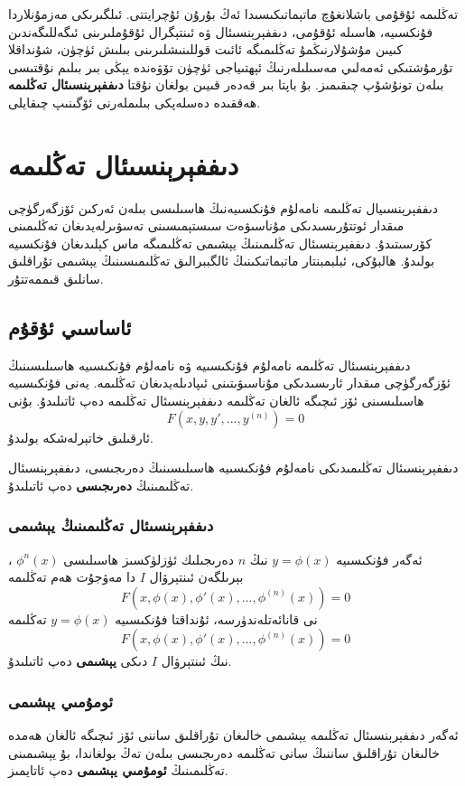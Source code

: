 \par\bigskip
\begin{tcolorbox}
تەڭلىمە ئۇقۇمى باشلانغۇچ ماتېماتىكىسىدا ئەڭ بۇرۇن ئۇچرايتتى. ئىلگىرىكى مەزمۇنلاردا فۇنكسىيە، ھاسىلە ئۇقۇمى، دىففېرېنسىئال ۋە ئىنتېگرال ئۇقۇملىرىنى ئىگەللىگەندىن كىيىن مۇشۇلارنىڭمۇ تەڭلىمىگە ئائىت قوللىنىشلىرىنى بىلىش ئۈچۈن، شۇنداقلا تۇرمۇشتىكى ئەمەلىي مەسىلىلەرنىڭ ئېھتىياجى ئۈچۈن تۆۋەندە يېڭى بىر بىلىم نۇقتىسى بىلەن تونۇشۇپ چىقىمىز. بۇ باپتا بىر قەدەر قىيىن بولغان نۇقتا
\textbf{دىففېرېنسىئال تەڭلىمە}
ھەققىدە دەسلەپكى بىلىملەرنى ئۆگىنىپ چىقايلى.

\end{tcolorbox}
\section{دىففېرېنسىئال تەڭلىمە}
دىففېرېنسىيال تەڭلىمە نامەلۇم فۇنكسىيەنىڭ ھاسىلىسى بىلەن ئەركىن ئۆزگەرگۈچى مىقدار ئوتتۇرىسىدىكى مۇناسىۋەت سىستېمىسىنى تەسۋىرلەيدىغان تەڭلىمىنى كۆرسىتىدۇ. دىففېرېنسىئال تەڭلىمىنىڭ يېشىمى تەڭلىمىگە ماس كېلىدىغان فۇنكسىيە بولىدۇ. ھالبۇكى، ئبلبمبنتار ماتبماتىكىنىڭ ئالگببرالىق تەڭلىمىسىنىڭ يېشىمى تۇراقلىق سانلىق قىممەتتۇر. 
\subsection{ئاساسىي ئۇقۇم}

\begin{MyDefinition}{دىففېرېنسىئال تەڭلىمە}{}
	نامەلۇم فۇنكىسىيە ۋە نامەلۇم فۇنكىسىيە ھاسىلىسىنىڭ ئۆزگەرگۈچى مىقدار ئارىسىدىكى مۇناسىۋىتىنى ئىپادىلەيدىغان تەڭلىمە. يەنى فۇنكىسىيە ھاسىلىسىنى ئۆز ئىچىگە ئالغان تەڭلىمە دىففېرېنسىئال تەڭلىمە دەپ ئاتىلىدۇ. بۇنى $$F(x,y,y',...,y^{(n)})=0$$ ئارقىلىق خاتېرلەشكە بولىدۇ.
\end{MyDefinition}
دىففېرېنسىئال تەڭلىمىدىكى نامەلۇم فۇنكىسىيە ھاسىلىسىنىڭ دەرىجىسى، دىففېرېنسىئال تەڭلىمىنىڭ \textbf{دەرىجىسى} دەپ ئاتىلىدۇ.

\subsubsection{دىففېرېنسىئال تەڭلىمىنىڭ يېشىمى}
ئەگەر فۇنكىسىيە $y=\phi(x)$ نىڭ $n$ دەرىجىلىك ئۈزلۈكسىز ھاسىلىسى $\phi^n(x)$ ، بېرىلگەن ئىنتېرۋال $I$ دا مەۋجۇت ھەم تەڭلىمە
$$F(x,\phi(x),\phi'(x),...,\phi^{(n)}(x))=0$$
نى قانائەتلەندۈرسە، ئۇنداقتا فۇنكىسىيە $y=\phi(x)$ تەڭلىمە
$$F(x,\phi(x),\phi'(x),...,\phi^{(n)}(x))=0$$
نىڭ ئىنتېرۋال $I$ دىكى \textbf{يېشىمى} دەپ ئاتىلىدۇ. 
\subsubsection{ئومۇمىي يېشىمى}
ئەگەر دىففېرېنسىئال تەڭلىمە يېشىمى خالىغان تۇراقلىق ساننى ئۆز ئىچىگە ئالغان ھەمدە خالىغان تۇراقلىق ساننىڭ سانى تەڭلىمە دەرىجىسى بىلەن تەڭ بولغاندا، بۇ يېشىمىنى تەڭلىمىنىڭ \textbf{ئومۇمىي يېشىمى} دەپ ئاتايمىز.
